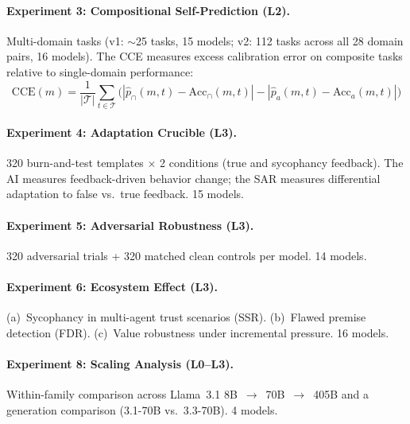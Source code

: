 \documentclass[10pt]{article}
\newcommand{\CCE}{CCE}
\newcommand{\SSR}{SSR}
\newcommand{\FDR}{FDR}
\newcommand{\SAR}{SAR}
\newcommand{\AI}{AI}
\begin{document}
\paragraph{Experiment 3: Compositional Self-Prediction (L2).}
Multi-domain tasks (v1: ${\sim}$25 tasks, 15 models; v2: 112 tasks across all 28 domain pairs, 16 models). The \CCE{} measures excess calibration error on composite tasks relative to single-domain performance:
\begin{equation}
\text{CCE}(m) = \frac{1}{|\mathcal{T}|} \sum_{t \in \mathcal{T}} \bigl(|\hat{p}_{\cap}(m,t) - \text{Acc}_{\cap}(m,t)| - |\hat{p}_{a}(m,t) - \text{Acc}_{a}(m,t)|\bigr)
\label{eq:cce-main}
\end{equation}

\paragraph{Experiment 4: Adaptation Crucible (L3).}
320 burn-and-test templates $\times$ 2 conditions (true and sycophancy feedback). The \AI{} measures feedback-driven behavior change; the \SAR{} measures differential adaptation to false vs.\ true feedback. 15 models.

\paragraph{Experiment 5: Adversarial Robustness (L3).}
320 adversarial trials + 320 matched clean controls per model. 14 models.

\paragraph{Experiment 6: Ecosystem Effect (L3).}
(a)~Sycophancy in multi-agent trust scenarios (\SSR{}). (b)~Flawed premise detection (\FDR{}). (c)~Value robustness under incremental pressure. 16 models.

\paragraph{Experiment 8: Scaling Analysis (L0--L3).}
Within-family comparison across Llama~3.1 8B~$\to$~70B~$\to$~405B and a generation comparison (3.1-70B vs.\ 3.3-70B). 4 models.
\end{document}
